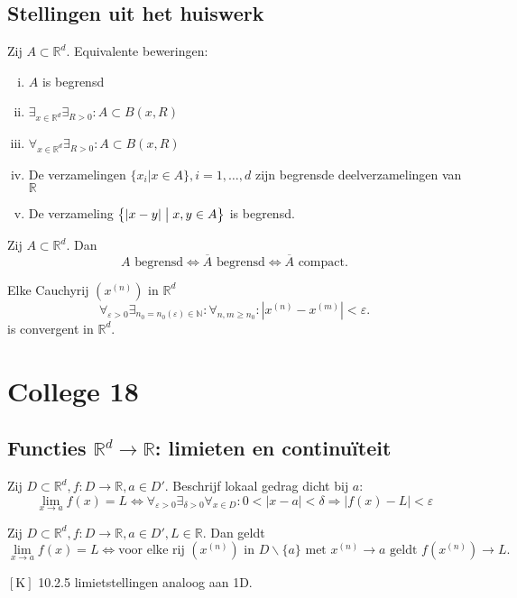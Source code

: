 \documentclass[a4paper]{exam}
\theoremstyle{definition}
\begin{document}
	\subsection{Stellingen uit het huiswerk}
		\theorem Zij $A \subset \mathbb{R}^d$. Equivalente beweringen:
			\begin{enumerate}[(i)]
				\item $A$ is begrensd
				\item $\exists _{x \in \mathbb{R}^d} \exists _{R>0}: A \subset B(x,R)$
      			\item $\forall _{x \in \mathbb{R}^d} \exists _{R>0}: A \subset B(x,R)$
      			\item De verzamelingen $\{ x_i | x \in A \}, i=1,\dots,d$ zijn begrensde deelverzamelingen van $\mathbb{R}$
      			\item De verzameling $\big\{|x-y| \bigm| x,y \in A \big\}$ is begrensd.
			\end{enumerate}
		
		\theorem Zij $A \subset \mathbb{R}^d$. Dan \[A \text{ begrensd} \Leftrightarrow \overline{A} \text{ begrensd} \Leftrightarrow \overline{A}\text{ compact}.\]
		
		\theorem Elke Cauchyrij $(x^{(n)})$ in $\mathbb{R}^d$  \[\forall _{\varepsilon >0} \exists _{n_0=n_0(\varepsilon )\in \mathbb{N}}:\forall _{n,m \geq n_0}: |x^{(n)}-x^{(m)}| < \varepsilon.\] is convergent in $\mathbb{R}^d$.
	
\newpage
\section{College 18}
	\subsection{Functies $\mathbb{R}^d \rightarrow \mathbb{R}$: limieten en continu\"iteit}
		Zij $D \subset \mathbb{R}^d, f: D\rightarrow \mathbb{R}, a \in D'$.
		  Beschrijf lokaal gedrag dicht bij $a$:
		\[ \lim_{x\rightarrow a}f(x)=L \Leftrightarrow \forall _{\varepsilon >0} \exists _{\delta >0} \forall _{x \in D}: 0<|x-a|<\delta \Rightarrow |f(x)-L|<\varepsilon\]
		
		\theorem Zij $D \subset \mathbb{R}^d, f:D\rightarrow \mathbb{R}, a \in D', L \in \mathbb{R}$. Dan geldt
		\[ \lim_{x \rightarrow a} f(x)=L \Leftrightarrow \text{voor elke rij } (x^{(n)}) \text{ in } D\backslash\{a\} \text{ met } x^{(n)}\rightarrow a \text{ geldt } f(x^{(n)}) \rightarrow L.\]
		
		\opm $\left[\text{K}\right]$ 10.2.5 limietstellingen analoog aan 1D.
		
\end{document}
